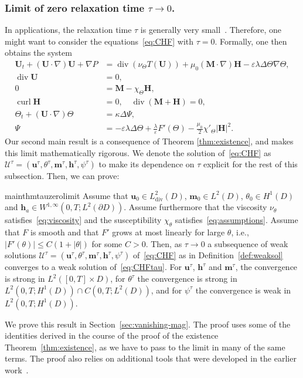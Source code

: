 \documentclass[10pt,letterpaper,twoside]{amsart}
\theoremstyle{definition}{\newtheorem{definition}[lemma]{Definition}}
\theoremstyle{note}{\newtheorem{claim}{Claim}[section]
\newtheorem*{claim*}{Claim}}
\numberwithin{equation}{section}
\newcommand{\dom}{D}
\newcommand{\eps}{\varepsilon}
\newcommand{\Grad}{\nabla}
\newcommand{\Div}{\operatorname{div}}
\newcommand{\Curl}{\operatorname{curl}}
\newcommand{\hdiv}{L^2_{\Div}(\dom)}
\newcommand{\bu}{\mathbf{u}}
\newcommand{\bm}{\mathbf{m}}
\newcommand{\Bu}{\mathbf{U}}
\newcommand{\Bm}{\mathbf{M}}
\newcommand{\Bh}{\mathbf{H}}
\newcommand{\bh}{\mathbf{h}}
\newcommand{\bmt}{\mathbf{m}^{\tau}}
\newcommand{\bht}{\mathbf{h}^{\tau}}
\newcommand{\but}{\mathbf{u}^{\tau}}
\newcommand{\tht}{\theta^{\tau}}
\newcommand{\psit}{\psi^{\tau}}
\begin{document}
\subsubsection{Limit of zero relaxation time $\tau \to 0$.} In applications, the relaxation time $\tau$ is generally very small~\cite{Rinaldi2002,Shliomis2002}. Therefore, one might want to consider the equations~\eqref{eq:CHF} with $\tau=0$. 
Formally, one then obtains the system
\begin{subequations}\label{eq:CHFtau}
	\begin{align}
		\Bu_t+(\Bu\cdot\Grad)\Bu+\Grad P&=\Div(\nu_\Theta T(\Bu))+\mu_0(\Bm\cdot\Grad)\Bh-\eps\lambda\Delta\Theta\Grad\Theta,\label{eq:nse1T}\\
		\Div\Bu&=0,\\
		0&=\Bm-\chi_\Theta\Bh,\label{eq:eqmT}\\
		\Curl\Bh &=0,\quad \Div(\Bm+\Bh)=0,\label{eq:maxwellT}\\
		\Theta_t+(\Bu\cdot\Grad)\Theta&=\kappa\Delta\Psi,\label{eq:phasefield1T}\\
		\Psi&= -\eps\lambda\Delta\Theta+\frac{\lambda}{\eps}F'(\Theta)-\frac{\mu_0}{2 }\chi'_\Theta|\Bh|^2.\label{eq:psiT}
	\end{align}
\end{subequations}
Our second main result is a consequence of Theorem \ref{thm:existence}, and makes this limit mathematically rigorous. We denote the solution of~\eqref{eq:CHF} as $\mathcal{U}^\tau=(\but,\tht,\bmt,\bht,\psit)$ to make its dependence on $\tau$ explicit for the rest of this subsection. Then, we can prove:
\begin{restatable}{mainthm}{tauzerolimit}
	\label{thm:tauzerolimit}
	Assume that
$\bu_0\in \hdiv$, $\bm_0\in L^2(\dom)$, $\theta_0\in H^1(\dom)$ and $\bh_a\in W^{1,\infty}(0,T;L^2(\partial\dom))$. Assume furthermore that the viscosity $\nu_\theta$ satisfies~\eqref{eq:viscosity} and the susceptibility $\chi_\theta$ satisfies~\eqref{eq:assumptions}. Assume that $F$ is smooth and that $F'$ grows at most linearly for large $\theta$, i.e., $|F'(\theta)|\leq C(1+|\theta|)$ for some $C>0$. Then, as $\tau\to 0$ a subsequence of weak solutions $\mathcal{U}^\tau=(\but,\tht,\bmt,\bht,\psit)$ of~\eqref{eq:CHF} as in Definition~\ref{def:weaksol} converges to a weak solution of~\eqref{eq:CHFtau}.
For $\but$, $\bht$ and $\bmt$, the convergence is strong in $L^2([0,T]\times\dom)$, for $\tht$ the convergence is strong in $L^2(0,T;H^1(\dom))\cap C(0,T;L^2(\dom))$, and for $\psit$ the convergence is weak in $L^2(0,T;H^1(\dom))$.
\end{restatable}
We prove this result in Section~\ref{sec:vanishing-mag}. The proof uses some of the identities derived in the course of the proof of the existence Theorem~\ref{thm:existence}, as we have to pass to the limit in many of the same terms. The proof also relies on additional tools that were developed in the earlier work~\cite{Nochetto2019}.
\end{document}
